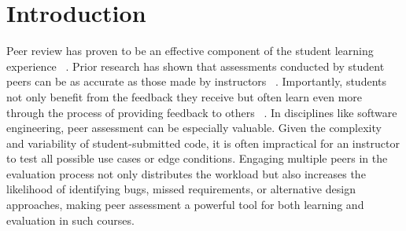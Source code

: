\documentclass[manuscript,review, anonymous]{acmart}
\begin{document}
\begin{abstract}
\end{abstract}


\maketitle
\section{Introduction}

Peer review has proven to be an effective component of the student learning experience ~\cite{topping1998peer}. Prior research has shown that assessments conducted by student peers can be as accurate as those made by instructors ~\cite{sadler2006impact}. Importantly, students not only benefit from the feedback they receive but often learn even more through the process of providing feedback to others ~\cite{rada1994collaborative, ccevik2015assessor, li2019power, graner1987revision}. In disciplines like software engineering, peer assessment can be especially valuable. Given the complexity and variability of student-submitted code, it is often impractical for an instructor to test all possible use cases or edge conditions. Engaging multiple peers in the evaluation process not only distributes the workload but also increases the likelihood of identifying bugs, missed requirements, or alternative design approaches, making peer assessment a powerful tool for both learning and evaluation in such courses.
\end{document}
